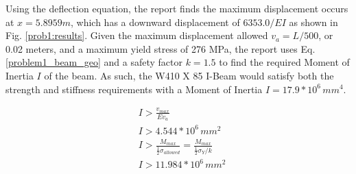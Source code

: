 \documentclass[a4paper]{article}
\begin{document}
Using the deflection equation, the report finds the maximum displacement occurs at $x = 5.8959 m$, which has a downward displacement of $6353.0/EI$ as shown in Fig. \ref{prob1:results}. Given the maximum displacement allowed $v_a = L/500$, or 0.02 meters, and a maximum yield stress of 276 MPa, the report uses Eq. \ref{problem1_beam_geo} and a safety factor $k=1.5$ to find the required Moment of Inertia $I$ of the beam. As such, the W410 X 85 I-Beam would satisfy both the strength and stiffness requirements with a Moment of Inertia $I=17.9 * 10^6\,{mm}^4$.

\begin{equation}
\begin{split}
& I > \frac{v_{max}}{Ev_a} \\
& I > 4.544 * 10^6\,{mm}^2 \\
& I > \frac{M_{max}}{\frac{1}{2}\sigma_{allowed}} = \frac{M_{max}}{\frac{1}{2}\sigma_Y/ k}\\
& I > 11.984 * 10^6\,{mm}^2 \\
\end{split}
\label{problem1_beam_geo}
\end{equation}
\end{document}
